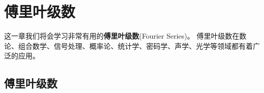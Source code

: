 \chapter{傅里叶级数}
这一章我们将会学习非常有用的\textbf{傅里叶级数}(Fourier Series)。
傅里叶级数在数论、组合数学、信号处理、概率论、统计学、密码学、声学、光学等领域都有着广泛的应用。


\section{傅里叶级数}
\label{sec:fourier_series}



% 
% 
% 
% 

